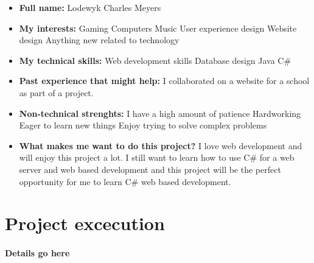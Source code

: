 \documentclass{article}
\begin{document}
	\begin{itemize}
		\item \textbf{Full name:} Lodewyk Charles Meyers
		\item \textbf{My interests:}
			\subitem Gaming
			\subitem Computers
			\subitem Music
			\subitem User experience design
			\subitem Website design
			\subitem Anything new related to technology
		\item \textbf{My technical skills:}
			\subitem Web development skills
			\subitem Database design
			\subitem Java
			\subitem C\#
		\item \textbf{Past experience that might help:}
			\subitem I collaborated on a website for a school as part of a project.			
		\item \textbf{Non-technical strenghts:}
			\subitem I have a high amount of patience
			\subitem Hardworking
			\subitem Eager to learn new things
			\subitem Enjoy trying to solve complex problems
		\item \textbf{What makes me want to do this project?} I love web development and will enjoy this project a lot. I still want to learn how to use C\# for a web server and web based development and this project will be the perfect opportunity for me to learn C\# web based development.
	\end{itemize}
	
	\section{Project excecution}
	\paragraph{Details go here}
\end{document}
